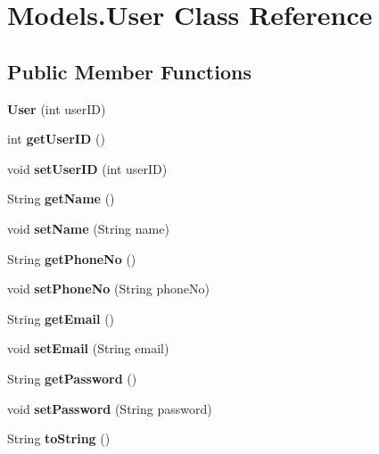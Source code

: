 \hypertarget{class_models_1_1_user}{}\section{Models.\+User Class Reference}
\label{class_models_1_1_user}
\subsection*{Public Member Functions}
\begin{DoxyCompactItemize}
\item 
\mbox{\label{class_models_1_1_user_a26ec2e56d6a80bef524343dd3c7c5e36}} 
{\bfseries User} (int user\+ID)
\item 
\mbox{\label{class_models_1_1_user_a4bb61bb9ffe57e61b1c985e3b63c872b}} 
int {\bfseries get\+User\+ID} ()
\item 
\mbox{\label{class_models_1_1_user_a8a9bfcf6c2491c6f53efb591cf64455e}} 
void {\bfseries set\+User\+ID} (int user\+ID)
\item 
\mbox{\label{class_models_1_1_user_aa0c2df4c6e9990eef2de7cf635d8672c}} 
String {\bfseries get\+Name} ()
\item 
\mbox{\label{class_models_1_1_user_a5601d54b66f46e2e253617156c2c99d4}} 
void {\bfseries set\+Name} (String name)
\item 
\mbox{\label{class_models_1_1_user_a4ddfc82c3b7e902c4435899d89b64b25}} 
String {\bfseries get\+Phone\+No} ()
\item 
\mbox{\label{class_models_1_1_user_a809c67ac9a8f567cd0aaf23d630f3eb7}} 
void {\bfseries set\+Phone\+No} (String phone\+No)
\item 
\mbox{\label{class_models_1_1_user_aa4f13c50ba29812c3149af5966334061}} 
String {\bfseries get\+Email} ()
\item 
\mbox{\label{class_models_1_1_user_aadf53b225afe34c50058dab960a8ed6d}} 
void {\bfseries set\+Email} (String email)
\item 
\mbox{\label{class_models_1_1_user_a0d7b5dfce7bf64d436db80e224633f84}} 
String {\bfseries get\+Password} ()
\item 
\mbox{\label{class_models_1_1_user_ac8d8c7b7de4f5b562ca04f929b5efb6d}} 
void {\bfseries set\+Password} (String password)
\item 
\mbox{\label{class_models_1_1_user_af948d1e0b5ce36cabacf8f6604f33573}} 
String {\bfseries to\+String} ()
\end{DoxyCompactItemize}
